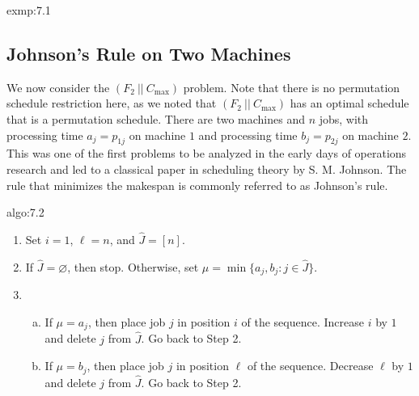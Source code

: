\begin{exmp}{exmp:7.1}
\begin{center}
    \end{center}
\end{exmp}

\subsection{Johnson's Rule on Two Machines} \label{subsec:7.2}
We now consider the $(F_2~||~C_{\max})$ problem. Note that there 
is no permutation schedule restriction here, as we noted that 
$(F_2~||~C_{\max})$ has an optimal schedule that is a permutation schedule. 
There are two machines and $n$ jobs, with processing time $a_j = p_{1j}$ on 
machine $1$ and processing time $b_j = p_{2j}$ on machine $2$. This was one of 
the first problems to be analyzed in the early days of operations research 
and led to a classical paper in scheduling theory by S. M. Johnson. 
The rule that minimizes the makespan is commonly referred to as 
Johnson's rule. 

\begin{algo}{algo:7.2}
    \begin{enumerate}[(1)]
        \item Set $i = 1$, $\ell = n$, and $\hat J = [n]$. 
        \item If $\hat J = \varnothing$, then stop. Otherwise, set 
        $\mu = \min\{a_j, b_j : j \in \hat J\}$. 
        \item \begin{enumerate}[(a)]
            \item If $\mu = a_j$, then place job $j$ in position $i$
            of the sequence. Increase $i$ by $1$ and delete $j$ from 
            $\hat J$. Go back to Step 2. 
            \item If $\mu = b_j$, then place job $j$ in position $\ell$
            of the sequence. Decrease $\ell$ by $1$ and delete $j$ from 
            $\hat J$. Go back to Step 2. 
        \end{enumerate} 
    \end{enumerate}
\end{algo}

